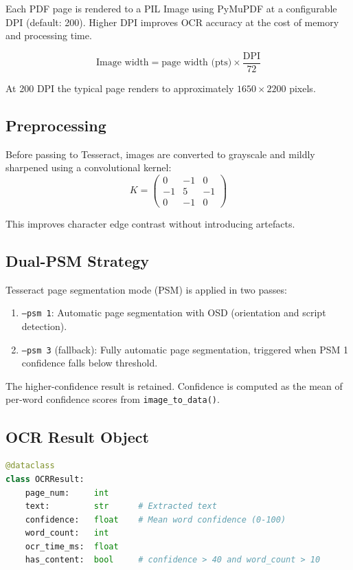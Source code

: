 \documentclass[12pt,a4paper]{report}
\begin{document}
Each PDF page is rendered to a PIL Image using PyMuPDF at a configurable DPI (default: 200). Higher DPI improves OCR accuracy at the cost of memory and processing time.

\begin{equation}
  \text{Image width} = \text{page width (pts)} \times \frac{\text{DPI}}{72}
\end{equation}

At 200 DPI the typical page renders to approximately $1650 \times 2200$ pixels.

\subsection{Preprocessing}

Before passing to Tesseract, images are converted to grayscale and mildly sharpened using a convolutional kernel:
\begin{equation}
  K = \begin{pmatrix} 0 & -1 & 0 \\ -1 & 5 & -1 \\ 0 & -1 & 0 \end{pmatrix}
\end{equation}

This improves character edge contrast without introducing artefacts.

\subsection{Dual-PSM Strategy}

Tesseract page segmentation mode (PSM) is applied in two passes:
\begin{enumerate}
  \item \texttt{--psm 1}: Automatic page segmentation with OSD (orientation and script detection).
  \item \texttt{--psm 3} (fallback): Fully automatic page segmentation, triggered when PSM 1 confidence falls below threshold.
\end{enumerate}

The higher-confidence result is retained. Confidence is computed as the mean of per-word confidence scores from \texttt{image\_to\_data()}.

\subsection{OCR Result Object}

\begin{lstlisting}[language=Python, caption={OCR result dataclass}]
@dataclass
class OCRResult:
    page_num:     int
    text:         str      # Extracted text
    confidence:   float    # Mean word confidence (0-100)
    word_count:   int
    ocr_time_ms:  float
    has_content:  bool     # confidence > 40 and word_count > 10
\end{lstlisting}
\end{document}
